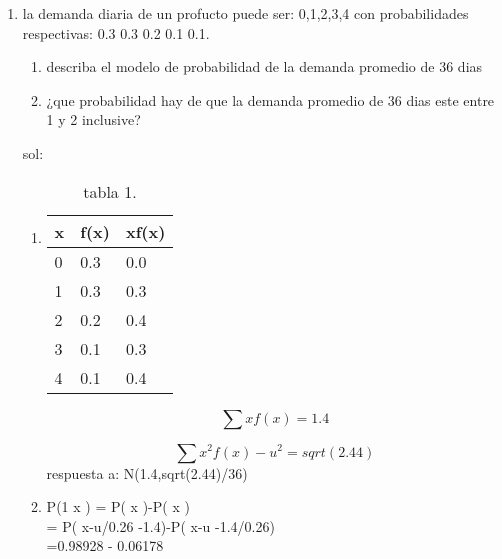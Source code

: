 \documentclass[12pt,a4paper,openany]{article}
\begin{document}
	\begin{enumerate}[5]
		\item la demanda diaria de un profucto puede ser: 0,1,2,3,4 con probabilidades respectivas: 0.3 0.3 0.2 0.1 0.1.
		\begin{enumerate}
			\item describa el modelo de probabilidad de la demanda promedio de 36 dias
			\item ¿que probabilidad hay de que la demanda promedio de 36 dias este entre 1 y 2 inclusive?
		\end{enumerate}
		sol:
		\begin{enumerate}
			\item 
			\begin{table}[htbp]
				\begin{center}
					\begin{tabular}{|l|l|l|}
						\hline
						x & f(x) & xf(x)\\
						\hline \hline \hline
						0 & 0.3 & 0.0 \\ \hline
						1 & 0.3 & 0.3 \\ \hline
						2 & 0.2 & 0.4 \\ \hline
						3 & 0.1 & 0.3 \\ \hline
						4 & 0.1 & 0.4 \\ \hline
					\end{tabular}
					\caption{tabla 1.}
					\label{tabla:sencilla}
				\end{center}
			\end{table}
			
			\[
			\sum xf(x)=1.4 
			\]
			
			\[
			\sum x^2f(x)-u^2=sqrt(2.44)
			\]
			respuesta a:
			N(1.4,sqrt(2.44)/36)
			\item 
			P(1 \le  x \le 2) = P( x )-P( x )\\
			= P( x-u/0.26 -1.4)-P( x-u -1.4/0.26)\\
			=0.98928 - 0.06178
		\end{enumerate}
	\end{enumerate}
	
\end{document}
